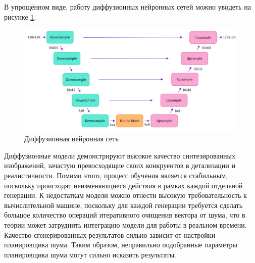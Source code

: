 В упрощённом виде, работу диффузионных нейронных сетей можно увидеть на рисунке \ref{fig:dnn_example}.
\begin{figure}[H]
    \centering
    \includegraphics[width=0.8\linewidth]{images/dnn_example.png}
    \caption{Диффузионная нейронная сеть}
    \label{fig:dnn_example}
\end{figure}

Диффузионные модели демонстрируют высокое качество синтезированных изображений, зачастую превосходящие своих конкруентов в детализации и реалистичности. Помимо этого, процесс обучения является стабильным, поскольку происходят неизменяющиеся действия в рамках каждой отдельной генерации. К недостаткам модели можно отнести высокую требовательность к вычислительной машине, поскольку для каждой генерации требуется сделать большое количество операций итеративного очищения вектора от шума, что в теории может затруднить интеграцию модели для работы в реальном времени. Качество сгенерированных результатов сильно зависит от настройки планировщика шума. Таким образом, неправильно подобранные параметры планировщика шума могут сильно исказить результаты.

